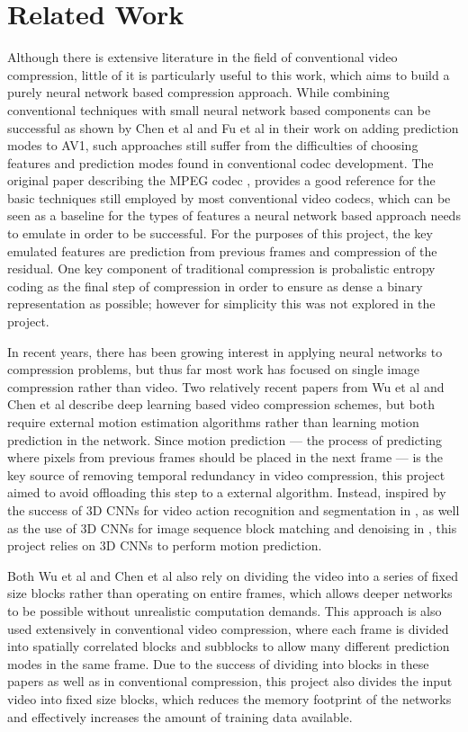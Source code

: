 \documentclass[10pt,twocolumn,letterpaper]{article}
\begin{document}
\section{Related Work}
Although there is extensive literature in the field of conventional video compression, little of it is particularly useful to this work, which aims to build a purely neural network based compression approach. While combining conventional techniques with small neural network based components can be successful as shown by Chen et al \cite{av1improv1} and Fu et al \cite{av1improv2} in their work on adding prediction modes to AV1, such approaches still suffer from the difficulties of choosing features and prediction modes found in conventional codec development. The original paper describing the MPEG codec \cite{LeGall}, provides a good reference for the basic techniques still employed by most conventional video codecs, which can be seen as a baseline for the types of features a neural network based approach needs to emulate in order to be successful. For the purposes of this project, the key emulated features are prediction from previous frames and compression of the residual. One key component of traditional compression is probalistic entropy coding as the final step of compression in order to ensure as dense a binary representation as possible; however for simplicity this was not explored in the project.

In recent years, there has been growing interest in applying neural networks to compression problems, but thus far most work has focused on single image compression rather than video. Two relatively recent papers from Wu et al \cite{DBLP:journals/corr/abs-1804-06919} and Chen et al \cite{DBLP:journals/corr/abs-1804-09869} describe deep learning based video compression schemes, but both require external motion estimation algorithms rather than learning motion prediction in the network. Since motion prediction --- the process of predicting where pixels from previous frames should be placed in the next frame --- is the key source of removing temporal redundancy in video compression, this project aimed to avoid offloading this step to a external algorithm. Instead, inspired by the success of 3D CNNs for video action recognition and segmentation in \cite{DBLP:journals/corr/abs-1712-01111}, as well as the use of 3D CNNs for image sequence block matching and denoising in \cite{DBLP:journals/corr/AhnC17}, this project relies on 3D CNNs to perform motion prediction.

Both Wu et al and Chen et al also rely on dividing the video into a series of fixed size blocks rather than operating on entire frames, which allows deeper networks to be possible without unrealistic computation demands. This approach is also used extensively in conventional video compression, where each frame is divided into spatially correlated blocks and subblocks to allow many different prediction modes in the same frame. Due to the success of dividing into blocks in these papers as well as in conventional compression, this project also divides the input video into fixed size blocks, which reduces the memory footprint of the networks and effectively increases the amount of training data available.
\end{document}
